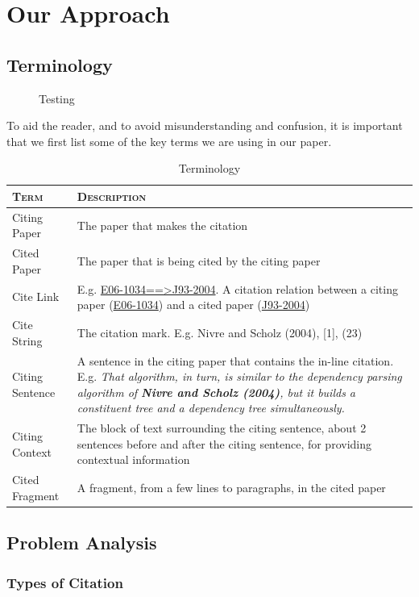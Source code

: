 \chapter{Our Approach}
\label{approach}
\section{Terminology}
\begin{figure}[h]
\label{fig:terminology}
\caption{Testing}
\end{figure}

To aid the reader, and to avoid misunderstanding and confusion, it is important that we first list some of the key terms we are using in our paper.
\begin{table}[h]
	\center
	\begin{tabular}{ l p{13cm}}
		\textsc{Term} & \textsc{Description}\\
		\hline
		Citing Paper & The paper that makes the citation \\
		Cited Paper & The paper that is being cited by the citing paper \\
		Cite Link & E.g. \url{E06-1034==>J93-2004}. A citation relation between a citing paper (\url{E06-1034}) and a cited paper (\url{J93-2004}) \\
		Cite String & The citation mark. E.g. Nivre and Scholz (2004), [1], (23) \\
		Citing Sentence & A sentence in the citing paper that contains the in-line citation. E.g. \textit{That algorithm, in turn, is similar to the dependency parsing algorithm of \textbf{Nivre and Scholz (2004)}, but it builds a constituent tree and a dependency tree simultaneously.} \\
		Citing Context & The block of text surrounding the citing sentence, about 2 sentences before and after the citing sentence, for providing contextual information \\
		Cited Fragment & A fragment, from a few lines to paragraphs, in the cited paper
	\end{tabular}
	\caption{Terminology}
	\label{tab:terminology}
\end{table}

\section{Problem Analysis}
\subsection{Types of Citation}
